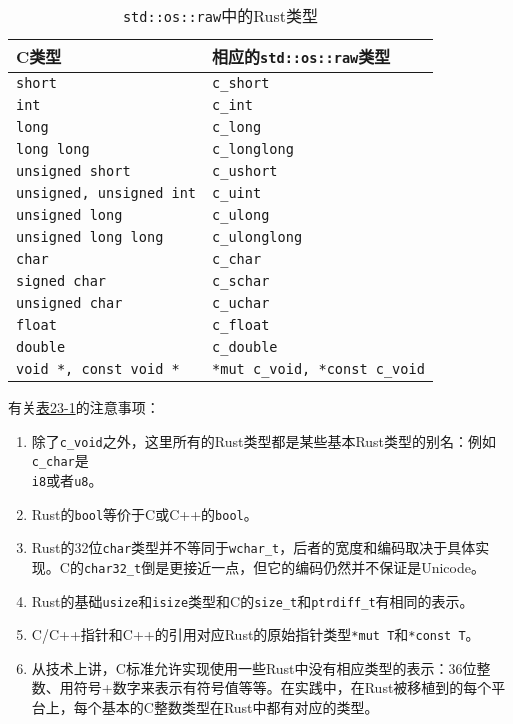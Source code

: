 \begin{table}[htbp]
    \centering
    \caption{\texttt{std::os::raw}中的Rust类型}
    \label{t23-1}
    \begin{tabular}{ll}
        \textbf{C类型}  &   \textbf{相应的\texttt{std::os::raw}类型}    \\
        \hline
        \texttt{short}          &   \texttt{c\_short}   \\
        \rowcolor{tablecolor}
        \texttt{int}            &   \texttt{c\_int}     \\
        \texttt{long}           &   \texttt{c\_long}    \\
        \rowcolor{tablecolor}
        \texttt{long long}      &   \texttt{c\_longlong}    \\
        \texttt{unsigned short} &   \texttt{c\_ushort}  \\
        \rowcolor{tablecolor}
        \texttt{unsigned, unsigned int} &   \texttt{c\_uint}    \\
        \texttt{unsigned long}  &   \texttt{c\_ulong}   \\
        \rowcolor{tablecolor}
        \texttt{unsigned long long}     &   \texttt{c\_ulonglong}   \\
        \texttt{char}           &   \texttt{c\_char}    \\
        \rowcolor{tablecolor}
        \texttt{signed char}    &   \texttt{c\_schar}   \\
        \texttt{unsigned char}  &   \texttt{c\_uchar}   \\
        \rowcolor{tablecolor}
        \texttt{float}           &   \texttt{c\_float}    \\
        \texttt{double}         &   \texttt{c\_double}  \\
        \rowcolor{tablecolor}
        \texttt{void *, const void *}   &   \texttt{*mut c\_void, *const c\_void}   \\
    \end{tabular}
\end{table}

有关\hyperref[t23-1]{表23-1}的注意事项：
\begin{enumerate}
    \item 除了\texttt{c\_void}之外，这里所有的Rust类型都是某些基本Rust类型的别名：例如\texttt{c\_char}是\\
    \texttt{i8}或者\texttt{u8}。
    \item Rust的\texttt{bool}等价于C或C++的\texttt{bool}。
    \item Rust的32位\texttt{char}类型并不等同于\texttt{wchar\_t}，后者的宽度和编码取决于具体实现。C的\texttt{char32\_t}倒是更接近一点，但它的编码仍然并不保证是Unicode。
    \item Rust的基础\texttt{usize}和\texttt{isize}类型和C的\texttt{size\_t}和\texttt{ptrdiff\_t}有相同的表示。
    \item C/C++指针和C++的引用对应Rust的原始指针类型\texttt{*mut T}和\texttt{*const T}。
    \item 从技术上讲，C标准允许实现使用一些Rust中没有相应类型的表示：36位整数、用符号+数字来表示有符号值等等。在实践中，在Rust被移植到的每个平台上，每个基本的C整数类型在Rust中都有对应的类型。
\end{enumerate}

